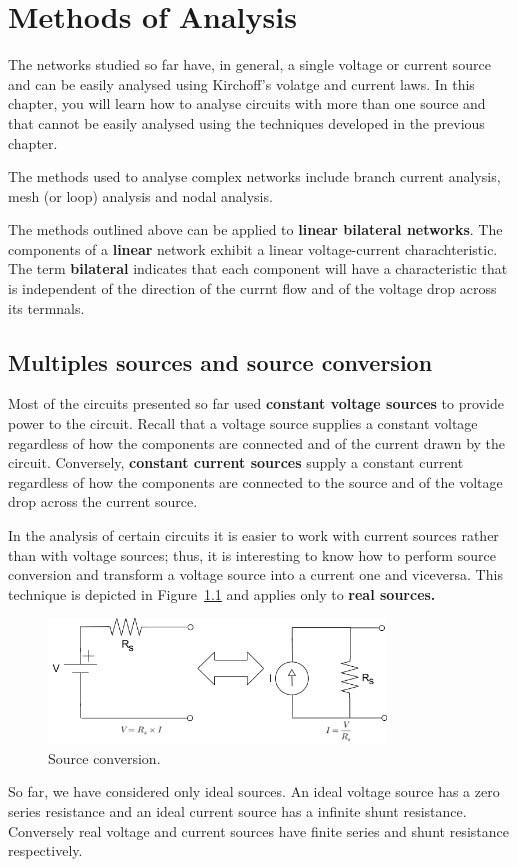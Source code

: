\chapter{Methods of Analysis}

\begin{summary}
 The networks studied so far have, in general, a single voltage or current source and can be easily analysed  using Kirchoff's volatge and current laws. In this chapter, you will learn how to analyse circuits with more than one source and that cannot be easily analysed using the techniques developed in the previous chapter.

 The methods used to analyse complex networks include branch current analysis, mesh (or loop) analysis and nodal analysis.

 The methods outlined above can be applied to \textbf{linear bilateral networks}. The components of a \textbf{linear} network exhibit a linear voltage-current charachteristic. The term \textbf{bilateral} indicates that each component will have a characteristic that is independent of the direction of the currnt flow and of the voltage drop across its termnals.  
\end{summary}

\section{Multiples sources and source conversion}
Most of the circuits presented so far used \textbf{constant voltage sources} to provide power to the circuit. Recall that a voltage source supplies a constant voltage regardless of how the components are connected and of the current drawn by the circuit. Conversely, \textbf{constant current sources} supply a constant current regardless of how the components 
are connected to the source and of the voltage drop across the current source.

In the analysis of certain circuits it is easier to work with current sources rather than with voltage sources; thus, it is interesting to know how to perform source conversion and transform a voltage source into a current one and viceversa. This technique is depicted in Figure~\ref{Fig:source_conversion} and applies only to \textbf{real sources.}
\begin{figure}[h!]
  \centering
  \includegraphics[width=0.8\textwidth]{"images/Fig-source-conversion"}
  \caption{Source conversion.} 
  \label{Fig:source_conversion}
\end{figure}
So far, we have considered only ideal sources. An ideal voltage source has a zero series resistance and an ideal current source has a infinite shunt resistance. Conversely real voltage and current sources have finite series and shunt resistance respectively.


